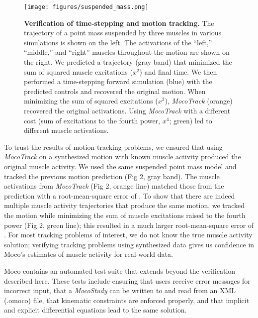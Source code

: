 \documentclass[10pt,letterpaper]{article}
\begin{document}
\begin{figure}[!h]
        \centering
        \texttt{[image: figures/suspended\_mass.png]}
        \caption{{\bf Verification of time-stepping and motion tracking.}
        The trajectory of a point mass suspended by three muscles in various simulations is shown on the left. The activations of the  “left,” “middle,” and “right” muscles throughout the motion are shown on the right. We predicted a trajectory (gray band) that minimized the sum of squared muscle excitations ($x^2$) and final time. We then performed a time-stepping forward simulation (blue) with the predicted controls and recovered the original motion. When minimizing the sum of squared excitations ($x^2$), \textit{MocoTrack} (orange) recovered the original activations. Using \textit{MocoTrack} with a different cost (sum of excitations to the fourth power, $x^4$; green) led to different muscle activations.}
        \label{verification}
\end{figure}

To trust the results of motion tracking problems, we ensured that using \textit{MocoTrack} on a synthesized motion with known muscle activity produced the original muscle activity. We used the same suspended point mass model and tracked the previous motion prediction (Fig 2, gray band). The muscle activations from \textit{MocoTrack} (Fig 2, orange line) matched those from the prediction with a root-mean-square error of \unskip. To show that there are indeed multiple muscle activity trajectories that produce the same motion, we tracked the motion while minimizing the sum of muscle excitations raised to the fourth power (Fig 2, green line); this resulted in a much larger root-mean-square error of \unskip. For most tracking problems of interest, we do not know the true muscle activity solution; verifying tracking problems using synthesized data gives us confidence in Moco’s estimates of muscle activity for real-world data.

Moco contains an automated test suite that extends beyond the verification described here. These tests include ensuring that users receive error messages for incorrect input, that a \textit{MocoStudy} can be written to and read from an XML (.omoco) file, that kinematic constraints are enforced properly, and that implicit and explicit differential equations lead to the same solution.
\end{document}
